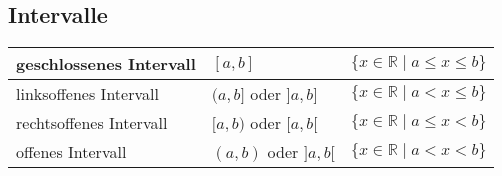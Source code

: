 \documentclass[parskip=half]{scrartcl}
\begin{document}
  \subsection*{Intervalle}
  \begin{center}
    \def\arraystretch{1.1}
    \begin{tabularx}{0.9\textwidth}{XXX}
    \toprule
      geschlossenes Intervall & $[a, b]$ & $\{ x\in\mathbb{R} \;|\; a \leq x \leq b\}$ \\
    \midrule
      linksoffenes Intervall & $(a, b]$ oder $]a, b]$ & $\{ x\in\mathbb{R} \;|\; a< x \leq b\}$ \\
    \midrule
      rechtsoffenes Intervall & $[a, b)$ oder $[a, b[$ & $\{ x\in\mathbb{R} \;|\; a \leq x < b\}$ \\
    \midrule
      offenes Intervall & $(a, b)$ oder $]a, b[$ & $\{ x\in\mathbb{R} \;|\; a< x < b\}$ \\
    \bottomrule
    \end{tabularx}
  \end{center}
\end{document}
